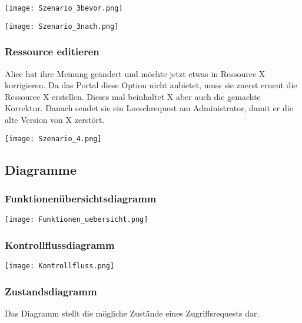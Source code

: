 \documentclass[parskip=full,11pt]{scrartcl}
\begin{document}
	\begin{center}
	\texttt{[image: Szenario\_3bevor.png]}
	
	\texttt{[image: Szenario\_3nach.png]}
	\end{center}

\subsubsection*{Ressource editieren}
Alice hat ihre Meinung geändert und möchte jetzt etwas in Ressource X korrigieren. Da das Portal diese Option nicht anbietet, muss sie zuerst erneut die Ressource X erstellen. Dieses mal beinhaltet X aber auch die gemachte Korrektur. Danach sendet sie ein Loeschrequest am Administrator, damit er die alte Version von X zerstört.\\
	
	\begin{center}
	\texttt{[image: Szenario\_4.png]}
	\end{center}
	
\subsection{Diagramme}

\subsubsection*{Funktionenübersichtsdiagramm}

	\begin{center}
	\texttt{[image: Funktionen\_uebersicht.png]}
	\end{center}
	
\subsubsection*{Kontrollflussdiagramm \grqq}

	\begin{center}
	\texttt{[image: Kontrollfluss.png]}
	\end{center}
	
\subsubsection*{Zustandsdiagramm \grqq}
Das Diagramm stellt die mögliche Zustände eines Zugriffsrequests dar.
\\
\end{document}
